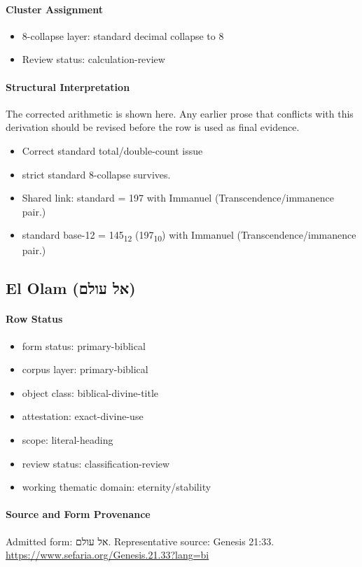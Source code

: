 \paragraph{Cluster Assignment}
\begin{itemize}
\item 8-collapse layer: standard decimal collapse to 8
\item Review status: calculation-review
\end{itemize}
\paragraph{Structural Interpretation}
The corrected arithmetic is shown here. Any earlier prose that conflicts with this derivation should be revised before the row is used as final evidence.

\begin{itemize}
\item Correct standard total/double-count issue
\item strict standard 8-collapse survives.
\item Shared link: standard = 197 with Immanuel (Transcendence/immanence pair.)
\item standard base-12 = 145\textsubscript{12} (197\textsubscript{10}) with Immanuel (Transcendence/immanence pair.)
\end{itemize}

\subsection{El Olam (אל עולם)}
\paragraph{Row Status}
\begin{itemize}
\item form status: primary-biblical
\item corpus layer: primary-biblical
\item object class: biblical-divine-title
\item attestation: exact-divine-use
\item scope: literal-heading
\item review status: classification-review
\item working thematic domain: eternity/stability
\end{itemize}
\paragraph{Source and Form Provenance}
Admitted form: אל עולם.
Representative source: Genesis 21:33.
\url{https://www.sefaria.org/Genesis.21.33?lang=bi}
